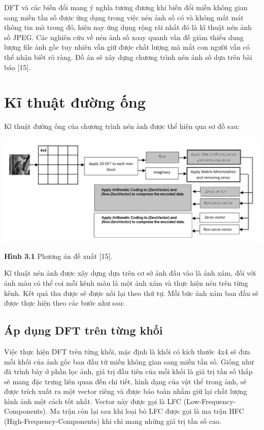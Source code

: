 \par DFT và các biến đổi mang ý nghĩa tương đương khi biến đổi miền không gian sang miền tần số được ứng dụng trong việc nén ảnh số có và không mất mát thông tin mà trong đó, hiện nay ứng dụng rộng rãi nhất đó là kĩ thuật nén ảnh số JPEG. Các nghiên cứu về nén ảnh số xoay quanh vấn đề giảm thiểu dung lượng file ảnh gốc tuy nhiên vẫn giữ được chất lượng mà mắt con người vẫn có thể nhận biết rõ ràng. Đồ án sẽ xây dựng chương trình nén ảnh số dựa trên bài báo [15].
\section{Kĩ thuật đường ống}
Kĩ thuật đường ống của chương trình nén ảnh được thể hiện qua sơ đồ sau:
\begin{center}
    \includegraphics[scale=0.5]{Figures/fig17.png}
    \par \textbf {Hình 3.1} Phương án đề xuất [15].
\end{center}
\par Kĩ thuật nén ảnh được xây dựng dựa trên cơ sở ảnh đầu vào là ảnh xám, đối với ảnh màu có thể coi mỗi kênh màu là một ảnh xám và thực hiện nén trên từng kênh. Kết quả thu được sẽ được nối lại theo thứ tự. Mỗi bức ảnh xám ban đầu sẽ được thực hiện theo các bước như sau:
\subsection{Áp dụng DFT trên từng khối}
\par Việc thực hiện DFT trên từng khối, mặc định là khối có kích thước 4x4 sẽ đưa mỗi khối của ảnh gốc ban đầu từ miền không gian sang miền tần số. Giống như đã trình bày ở phần lọc ảnh, giá trị đầu tiên của mỗi khối là giá trị tần số thấp sẽ mang đặc trưng liên quan đến chi tiết, hình dạng của vật thể trong ảnh, sẽ được trích xuất ra một vector riêng và được bảo toàn nhằm giữ lại chất lượng hình ảnh một cách tốt nhất. Vector này được gọi là LFC (Low-Frequency-Components). Ma trận còn lại sau khi loại bỏ LFC được gọi là ma trận HFC (High-Frequency-Components) khi chỉ mang những giá trị tần số cao.

